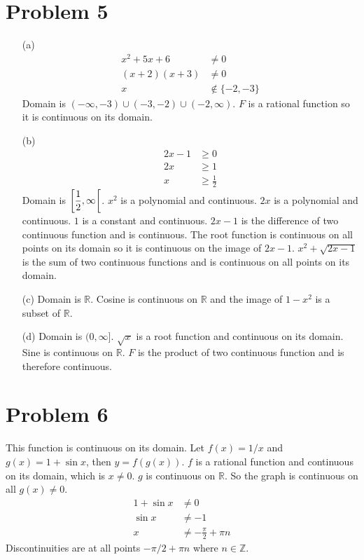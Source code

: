 \documentclass{article}
\newcommand*{\problem}[1]{\section*{Problem #1}}
\begin{document}
\problem{5}
\begin{itemize}
	\item[(a)]
	\begin{align*}
		x^2+5x+6&\neq0 \\
		(x+2)(x+3)&\neq0 \\
		x&\not\in\{-2,-3\}
	\end{align*}
	Domain is $(-\infty,-3)\cup(-3,-2)\cup(-2,\infty)$. $F$ is a rational function so it is continuous on its domain.

	\item[(b)]
	\begin{align*}
		2x-1&\geq0 \\
		2x&\geq1 \\
		x&\geq\frac{1}{2}
	\end{align*}
	Domain is $\interval[scaled,open right]{\dfrac{1}{2}}{\infty}$. $x^2$ is a polynomial and continuous. $2x$ is a polynomial and continuous. $1$ is a constant and continuous. $2x-1$ is the difference of two continuous function and is continuous. The root function is continuous on all points on its domain so it is continuous on the image of $2x-1$. $x^2+\sqrt{2x-1}$ is the sum of two continuous functions and is continuous on all points on its domain.

	\item[(c)]
	Domain is $\mathbb{R}$. Cosine is continuous on $\mathbb{R}$ and the image of $1-x^2$ is a subset of $\mathbb{R}$.

	\item[(d)]
	Domain is $(0,\infty]$. $\sqrt{x}$ is a root function and continuous on its domain. Sine is continuous on $\mathbb{R}$. $F$ is the product of two continuous function and is therefore continuous. 
\end{itemize}

\problem{6}
This function is continuous on its domain. Let $f(x)=1/x$ and $g(x)=1+\sin x$, then $y=f(g(x))$. $f$ is a rational function and continuous on its domain, which is $x\neq0$. $g$ is continuous on $\mathbb{R}$. So the graph is continuous on all $g(x)\neq0$.
\begin{align*}
	1+\sin x&\neq0 \\
	\sin x&\neq-1 \\
	x&\neq-\frac{\pi}{2}+\pi n
\end{align*}
Discontinuities are at all points $-\pi/2+\pi n$ where $n\in\mathbb{Z}$.
\end{document}
